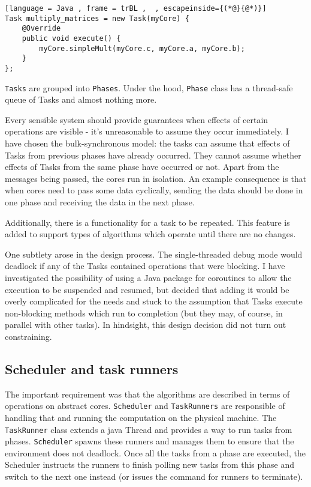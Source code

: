 \documentclass[12pt,a4paper,twoside,openright]{report}
\begin{document}
\begin{lstlisting}[language = Java , frame = trBL ,  , escapeinside={(*@}{@*)}]
Task multiply_matrices = new Task(myCore) {
    @Override
    public void execute() {
        myCore.simpleMult(myCore.c, myCore.a, myCore.b);
    }
};
\end{lstlisting}


\texttt{Tasks} are grouped into \texttt{Phases}. Under the hood, \texttt{Phase} class has a thread-safe queue of Tasks and almost nothing more.

Every sensible system should provide guarantees when effects of certain operations are visible - it's unreasonable to assume they occur immediately. I have chosen the bulk-synchronous model: the tasks can assume that effects of Tasks from previous phases have already occurred. They cannot assume whether effects of Tasks from the same phase have occurred or not. Apart from the messages being passed, the cores run in isolation. An example consequence is that when cores need to pass some data cyclically, sending the data should be done in one phase and receiving the data in the next phase.

Additionally, there is a functionality for a task to be repeated. This feature is added to support types of algorithms which operate until there are no changes.

One subtlety arose in the design process. The single-threaded debug mode would deadlock if any of the Tasks contained operations that were blocking. I have investigated the possibility of using a Java package for coroutines to allow the execution to be suspended and resumed, but decided that adding it would be overly complicated for the needs and stuck to the assumption that Tasks execute non-blocking methods which run to completion (but they may, of course, in parallel with other tasks). In hindsight, this design decision did not turn out constraining.

\subsection{Scheduler and task runners}
The important requirement was that the algorithms are described in terms of operations on abstract cores. \texttt{Scheduler} and \texttt{TaskRunners} are responsible of handling that and running the computation on the physical machine. The \texttt{TaskRunner} class extends a java Thread and provides a way to run tasks from phases. \texttt{Scheduler} spawns these runners and manages them to ensure that the environment does not deadlock. Once all the tasks from a phase are executed, the Scheduler instructs the runners to finish polling new tasks from this phase and switch to the next one instead (or issues the command for runners to terminate).
\end{document}
